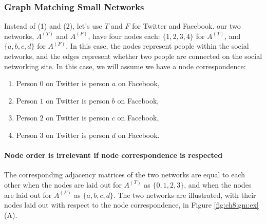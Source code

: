 \subsubsection*{Graph Matching Small Networks}


Instead of (1) and (2), let's use $T$ and $F$ for Twitter and Facebook. our two networks, $A^{(T)}$ and $A^{(F)}$, have four nodes each: $\{1, 2, 3, 4\}$ for $A^{(T)}$, and $\{a, b, c, d\}$ for $A^{(F)}$. In this case, the nodes represent people within the social networks, and the edges represent whether two people are connected on the social networking site. In this case, we will assume we have a node correspondence:
\begin{enumerate}
    \item Person $0$ on Twitter is person $a$ on Facebook,
    \item Person $1$ on Twitter is person $b$ on Facebook,
    \item Person $2$ on Twitter is person $c$ on Facebook,
    \item Person $3$ on Twitter is person $d$ on Facebook.
\end{enumerate}

\paragraph*{Node order is irrelevant if node correspondence is respected}

The corresponding adjacency matrices of the two networks are equal to each other when the nodes are laid out for $A^{(T)}$ as $\{0, 1, 2, 3\}$, and when the nodes are laid out for $A^{(F)}$ as $\{a,b,c,d\}$. The two networks are illustrated, with their nodes laid out with respect to the node correspondence, in Figure \ref{fig:ch8:gm:ex}(A).

